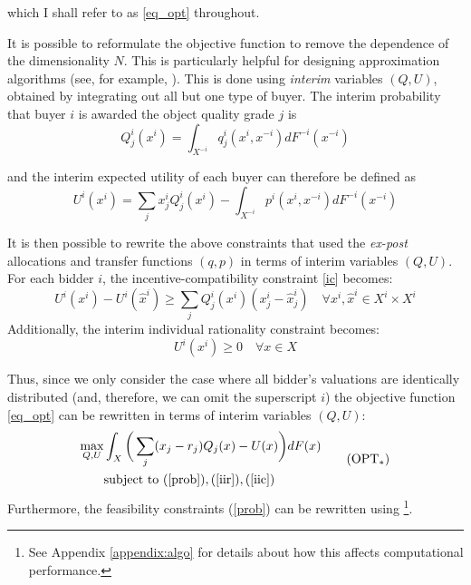 \noindent which I shall refer to as \ref{eq_opt} throughout. 

It is possible to reformulate the objective function to remove the dependence of the dimensionality $N$. This is particularly helpful for designing approximation algorithms (see, for example, \cite{belloni2010multidimensional}). This is done using \textit{interim} variables $(Q, U)$, obtained by integrating out all but one type of buyer. The interim probability that buyer $i$ is awarded the object quality grade $j$ is
\begin{equation}
    Q_j^i(x^i) = \int_{X^{-i}} q_j^i(x^i,x^{-i}) dF^{-i}(x^{-i})
\end{equation}

\noindent and the interim expected utility of each buyer can therefore be defined as
\begin{equation}
    U^i(x^i) = \sum_j x_j^i Q_j^i(x^i) - \int_{X^{-i}} p^i(x^i,x^{-i}) dF^{-i}(x^{-i})
\end{equation}

It is then possible to rewrite the above constraints that used the \textit{ex-post} allocations and transfer functions $(q,p)$ in terms of interim variables $(Q,U)$. For each bidder $i$, the incentive-compatibility constraint \ref{ic} becomes:
\begin{equation}\label{iic}
    U^i(x^i) - U^i(\hat{x}^i) \geq \sum_j Q_j^i(x^i) (x_j^i - \hat{x}_j^i) \quad \forall x^i, \hat{x}^i \in X^i \times X^i \tag{IIC}
\end{equation}
\noindent Additionally, the interim individual rationality constraint becomes:
\begin{equation}\label{iir}
    U^i(x^i) \geq 0 \quad \forall x \in X \tag{IIR}
\end{equation}

Thus, since we only consider the case where all bidder's valuations are identically distributed (and, therefore, we can omit the superscript $i$) the objective function \ref{eq_opt} can be rewritten in terms of interim variables $(Q,U)$:
\begin{equation}
\begin{aligned}\label{eq_opt_interim}
    \max_{Q,U} &\int_X \bigg( \sum_j (x_j - r_j) Q_j(x) - U(x) \bigg) dF(x) \\
    &\text{subject to } (\ref{prob}), (\ref{iir}), (\ref{iic})
\end{aligned}  \tag{OPT$_*$} 
\end{equation}
\noindent Furthermore, the feasibility constraints (\ref{prob}) can be rewritten using \autocite{border1991implementation}\footnote{See Appendix \ref{appendix:algo} for details about how this affects computational performance.}.





